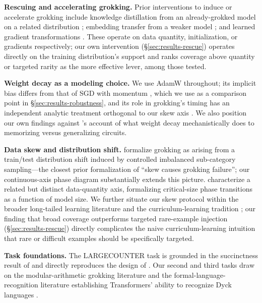 \documentclass[11pt]{article}
\begin{document}
\textbf{Rescuing and accelerating grokking.} Prior interventions to induce or accelerate grokking include knowledge distillation from an already-grokked model on a related distribution \citep{singh2025datafallsshort}; embedding transfer from a weaker model \citep{xu2025letmegrok}; and learned gradient transformations \citep{zhou2025neuralgrok}. These operate on data quantity, initialization, or gradients respectively; our own intervention (\S\ref{sec:results-rescue}) operates directly on the training distribution's support and ranks coverage above quantity or targeted rarity as the more effective lever, among those tested.

\textbf{Weight decay as a modeling choice.} We use AdamW \citep{loshchilov2019decoupled} throughout; its implicit bias differs from that of SGD with momentum \citep{xie2024implicitbias}, which we use as a comparison point in \S\ref{sec:results-robustness}, and its role in grokking's timing has an independent analytic treatment orthogonal to our skew axis \citep{kim2026weightdecayclock}. We also position our own findings against \citet{doshi2023togrok}'s account of what weight decay mechanistically does to memorizing versus generalizing circuits.

\textbf{Data skew and distribution shift.} \citet{carvalho2025grokkingexplained} formalize grokking as arising from a train/test distribution shift induced by controlled imbalanced sub-category sampling---the closest prior formalization of ``skew causes grokking failure''; our continuous-axis phase diagram substantially extends this picture. \citet{zhu2024criticaldatasize} characterize a related but distinct data-quantity axis, formalizing critical-size phase transitions as a function of model size. We further situate our skew protocol within the broader long-tailed learning literature \citep{zhang2021longtailed,dealvis2024longtailsurvey} and the curriculum-learning tradition \citep{bengio2009curriculum}; our finding that broad coverage outperforms targeted rare-example injection (\S\ref{sec:results-rescue}) directly complicates the naive curriculum-learning intuition that rare or difficult examples should be specifically targeted.

\textbf{Task foundations.} The LARGECOUNTER task is grounded in the succinctness result of \citet{bergstrasser2026succinct} and directly reproduces the design of \citet{zhao2026grok}. Our second and third tasks draw on the modular-arithmetic grokking literature \citep{gromov2023grokkingmodular,doshi2024modularpolynomials,doshi2023togrok,mccracken2025universalabstract} and the formal-language-recognition literature establishing Transformers' ability to recognize Dyck languages \citep{weiss2021thinking,ebrahimi2020dyckn,bhattamishra2020ability,yao2021boundedhierarchical,merrill2022saturated,strobl2024survey}.
\end{document}
